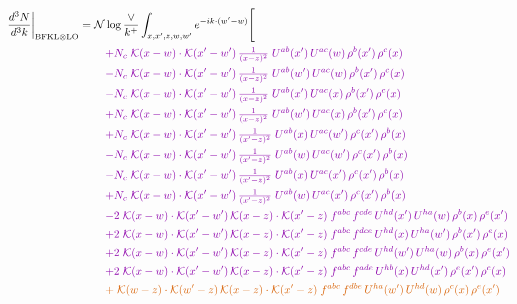 \documentclass[10pt]{article}
\numberwithin{equation}{section}
\newcommand{\NNv}{\mathcal N\log\frac{\vee}{k^+}}
\begin{document}
\begin{align}
\frac{d^3N}{d^3k}\bigg|_{{\rm BFKL}\otimes{\rm LO}}={}&\NNv\int_{x,x',z,w,w'}e^{-ik\cdot(w'-w)}\Bigg[\notag\\
&\quad{\color{CC}+N_c\;\mathcal{K}(x-w)\cdot\mathcal{K}(x'-w')\,\tfrac{1}{(x-z)^{2}}\;U^{ab}(x')\,U^{ac}(w)\,\rho^{b}(x')\,\rho^{c}(x)}\notag\\
&\quad{\color{CC}-N_c\;\mathcal{K}(x-w)\cdot\mathcal{K}(x'-w')\,\tfrac{1}{(x-z)^{2}}\;U^{ab}(w')\,U^{ac}(w)\,\rho^{b}(x')\,\rho^{c}(x)}\notag\\
&\quad{\color{CC}-N_c\;\mathcal{K}(x-w)\cdot\mathcal{K}(x'-w')\,\tfrac{1}{(x-z)^{2}}\;U^{ab}(x')\,U^{ac}(x)\,\rho^{b}(x')\,\rho^{c}(x)}\notag\\
&\quad{\color{CC}+N_c\;\mathcal{K}(x-w)\cdot\mathcal{K}(x'-w')\,\tfrac{1}{(x-z)^{2}}\;U^{ab}(w')\,U^{ac}(x)\,\rho^{b}(x')\,\rho^{c}(x)}\notag\\
&\quad{\color{CC}+N_c\;\mathcal{K}(x-w)\cdot\mathcal{K}(x'-w')\,\tfrac{1}{(x'-z)^{2}}\;U^{ab}(x)\,U^{ac}(w')\,\rho^{c}(x')\,\rho^{b}(x)}\notag\\
&\quad{\color{CC}-N_c\;\mathcal{K}(x-w)\cdot\mathcal{K}(x'-w')\,\tfrac{1}{(x'-z)^{2}}\;U^{ab}(w)\,U^{ac}(w')\,\rho^{c}(x')\,\rho^{b}(x)}\notag\\
&\quad{\color{CC}-N_c\;\mathcal{K}(x-w)\cdot\mathcal{K}(x'-w')\,\tfrac{1}{(x'-z)^{2}}\;U^{ab}(x)\,U^{ac}(x')\,\rho^{c}(x')\,\rho^{b}(x)}\notag\\
&\quad{\color{CC}+N_c\;\mathcal{K}(x-w)\cdot\mathcal{K}(x'-w')\,\tfrac{1}{(x'-z)^{2}}\;U^{ab}(w)\,U^{ac}(x')\,\rho^{c}(x')\,\rho^{b}(x)}\notag\\
&\quad{\color{CC}-2\;\mathcal{K}(x-w)\cdot\mathcal{K}(x'-w')\,\mathcal{K}(x-z)\cdot\mathcal{K}(x'-z)\;f^{abc}\,f^{cde}\,U^{hd}(x')\,U^{ha}(w)\,\rho^{b}(x)\,\rho^{e}(x')}\notag\\
&\quad{\color{CC}+2\;\mathcal{K}(x-w)\cdot\mathcal{K}(x'-w')\,\mathcal{K}(x-z)\cdot\mathcal{K}(x'-z)\;f^{abc}\,f^{dce}\,U^{hd}(x)\,U^{ha}(w')\,\rho^{b}(x')\,\rho^{e}(x)}\notag\\
&\quad{\color{CC}+2\;\mathcal{K}(x-w)\cdot\mathcal{K}(x'-w')\,\mathcal{K}(x-z)\cdot\mathcal{K}(x'-z)\;f^{abc}\,f^{cde}\,U^{hd}(w')\,U^{ha}(w)\,\rho^{b}(x)\,\rho^{e}(x')}\notag\\
&\quad{\color{CC}+2\;\mathcal{K}(x-w)\cdot\mathcal{K}(x'-w')\,\mathcal{K}(x-z)\cdot\mathcal{K}(x'-z)\;f^{abc}\,f^{ade}\,U^{hb}(x)\,U^{hd}(x')\,\rho^{e}(x')\,\rho^{c}(x)}\notag\\
&\quad{\color{BFK}+\;\mathcal{K}(w-z)\cdot\mathcal{K}(w'-z)\,\mathcal{K}(x-z)\cdot\mathcal{K}(x'-z)\;f^{abc}\,f^{dbe}\,U^{ha}(w')\,U^{hd}(w)\,\rho^{c}(x)\,\rho^{e}(x')}\notag\\

\end{align}
\end{document}
